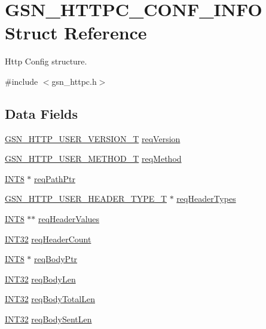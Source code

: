 \hypertarget{a00093}{
\section{GSN\_\-HTTPC\_\-CONF\_\-INFO Struct Reference}
\label{a00093}
}


Http Config structure.  




{\ttfamily \#include $<$gsn\_\-httpc.h$>$}

\subsection*{Data Fields}
\begin{DoxyCompactItemize}
\item 
\hyperlink{a00665_ga8a5357a42219f22430d5bf97d136092d}{GSN\_\-HTTP\_\-USER\_\-VERSION\_\-T} \hyperlink{a00093_abb6e9745613c073afeb3e2caa30ec30b}{reqVersion}
\item 
\hyperlink{a00665_ga19c754176c7cf6f41749aa60c125ee7e}{GSN\_\-HTTP\_\-USER\_\-METHOD\_\-T} \hyperlink{a00093_af0a2fd6f6a7f7d2f17fc4e968a22377d}{reqMethod}
\item 
\hyperlink{a00660_ga307b8734c020247f6bac4fcde0dcfbb9}{INT8} $\ast$ \hyperlink{a00093_a89c93815bbc36a53553865e3a843157e}{reqPathPtr}
\item 
\hyperlink{a00665_gacdf2ed5f026ce7b549a8151c0a5f0129}{GSN\_\-HTTP\_\-USER\_\-HEADER\_\-TYPE\_\-T} $\ast$ \hyperlink{a00093_a2893ecdbedbe657c632357e8651e4a1d}{reqHeaderTypes}
\item 
\hyperlink{a00660_ga307b8734c020247f6bac4fcde0dcfbb9}{INT8} $\ast$$\ast$ \hyperlink{a00093_afad42cc06ee73f9d4741c7390a3960ad}{reqHeaderValues}
\item 
\hyperlink{a00660_ga63021d67d54286c2163bcdb43a6f2569}{INT32} \hyperlink{a00093_af8c823ceca7898af08fb3720c9986639}{reqHeaderCount}
\item 
\hyperlink{a00660_ga307b8734c020247f6bac4fcde0dcfbb9}{INT8} $\ast$ \hyperlink{a00093_ada90e2ecee9c50c7d2018d6e394492f1}{reqBodyPtr}
\item 
\hyperlink{a00660_ga63021d67d54286c2163bcdb43a6f2569}{INT32} \hyperlink{a00093_a58695d31385d9e33538edf494e1cff76}{reqBodyLen}
\item 
\hyperlink{a00660_ga63021d67d54286c2163bcdb43a6f2569}{INT32} \hyperlink{a00093_af375053fba5740b0113160f149404c23}{reqBodyTotalLen}
\item 
\hyperlink{a00660_ga63021d67d54286c2163bcdb43a6f2569}{INT32} \hyperlink{a00093_ad2788be66932fd0137193d01dff57d90}{reqBodySentLen}
$$
\end{DoxyCompactItemize}
